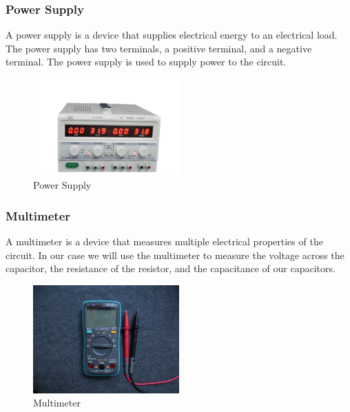 \documentclass[a4paper, 10pt]{article}
\begin{document}
				\pagebreak
			\subsubsection{Power Supply}
				A power supply is a device that supplies electrical energy to an electrical load. 
				The power supply has two terminals, a positive terminal, and a negative terminal. 
				The power supply is used to supply power to the circuit.\\

				\begin{figure}[h!]
					\centering
					\includegraphics[width=0.5\textwidth]{./images/DC-PowerSupply.jpeg}
					\caption{Power Supply}
					\label{fig:power_supply}
				\end{figure}

			\subsubsection{Multimeter}
				A multimeter is a device that measures multiple electrical properties of the circuit. 
				In our case we will use the multimeter to measure the voltage across the capacitor, the resistance of the
				resistor, and the capacitance of our capacitors.\\

				\begin{figure}[h!]
					\centering
					\includegraphics[width=0.5\textwidth]{./images/Multimeter.jpg}
					\caption{Multimeter}
					\label{fig:multimeter}
				\end{figure}
\end{document}
